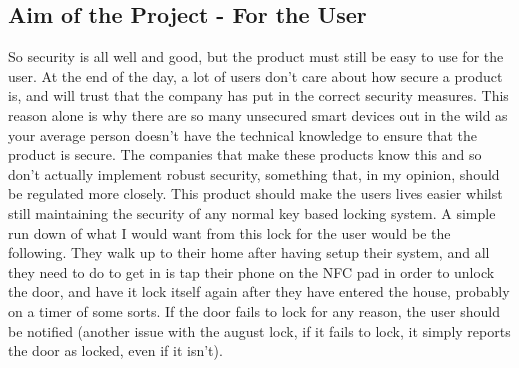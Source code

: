 \subsection{Aim of the Project - For the User}
So security is all well and good, but the product must still be easy to use for the user. At the end of the day, a lot of users don't care about how secure a product is, and will trust that the company has put in the correct security measures. This reason alone is why there are so many unsecured smart devices out in the wild as your average person doesn't have the technical knowledge to ensure that the product is secure. The companies that make these products know this and so don't actually implement robust security, something that, in my opinion, should be regulated more closely. This product should make the users lives easier whilst still maintaining the security of any normal key based locking system.
\newline
\newline
A simple run down of what I would want from this lock for the user would be the following. They walk up to their home after having setup their system, and all they need to do to get in is tap their phone on the NFC pad in order to unlock the door, and have it lock itself again after they have entered the house, probably on a timer of some sorts. If the door fails to lock for any reason, the user should be notified (another issue with the august lock, if it fails to lock, it simply reports the door as locked, even if it isn't).


